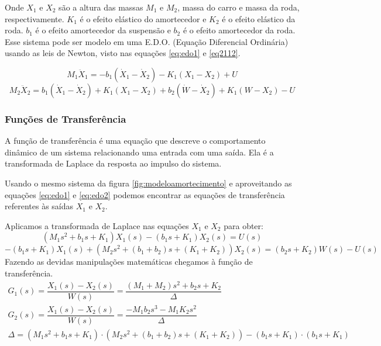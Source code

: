 Onde $X_1$ e $X_2$ são a altura das massas $M_1$ e $M_2$, massa do carro e massa da roda, respectivamente. $K_1$ é o efeito elástico do amortecedor e $K_2$ é o efeito elástico da roda. $b_1$ é o efeito amortecedor da suspensão e $b_2$ é o efeito amortecedor da roda.
Esse sistema pode ser modelo em uma E.D.O. (Equação Diferencial Ordinária) usando as leis de Newton, visto nas equações \ref{eq:edo1} e \ref{eq2112}.

\begin{equation} \label{eq:edo1}
M_1 \ddot{X}_1=-b_1(\dot{X}_1-\dot{X}_2) -K_1(X_1-X_2)+U
\end{equation}
\begin{equation} \label{eq:edo2}
M_2 \ddot{X}_2=b_1 (\dot{X}_1 -\dot{X}_2) +K_1(X_1-X_2) +b_2(\dot{W} -\dot{X}_2)+K_1(W-X_2) -U
\end{equation}

\subsubsection{Funções de Transferência}
A função de transferência é uma equação que descreve o comportamento dinâmico de um sistema relacionando uma entrada com uma saída. Ela é a transformada de Laplace da resposta ao impulso do sistema.

Usando o mesmo sistema da figura \ref{fig:modeloamortecimento} e aproveitando as equações \ref{eq:edo1} e \ref{eq:edo2} podemos encontrar as equações de transferência referentes às saídas $X_1$ e $X_2$.

Aplicamos a transformada de Laplace nas equações $X_1$ e $X_2$ para obter:
\begin{equation} \label{eq2121}
(M_1s^2+b_1s+K_1) X_1(s) -(b_1s+K_1) X_2(s)=U(s)
\end{equation}
\begin{equation} \label{eq2122}
-(b_1s+ K_1) X_1(s) +(M_2s^2 + (b_1 + b_2)s +(K_1 + K_2))X_2(s)=(b_2s +K_2) W(s)-U(s)
\end{equation}
Fazendo as devidas manipulações matemáticas chegamos à função de transferência.
\begin{equation}\label{eq2123}
\begin{array}{c}
G_1(s)=\dfrac{X_1(s)-X_2(s)}{W(s)}= \dfrac{(M_1+M_2)s^2+b_2s+K_2} {\Delta}
\\
G_2(s)=\dfrac{X_1(s)-X_2(s)}{W(s)}= \dfrac{-M_1b_2s^3-M_1K_2s^2}{\Delta}
\\
\Delta=(M_1s^2+b_1s+K_1)\cdot (M_2s^2+ (b_1+b_2)s+(K_1+K_2))-(b_1s+K_1)\cdot (b_1s+K_1)
\end{array}
\end{equation}

